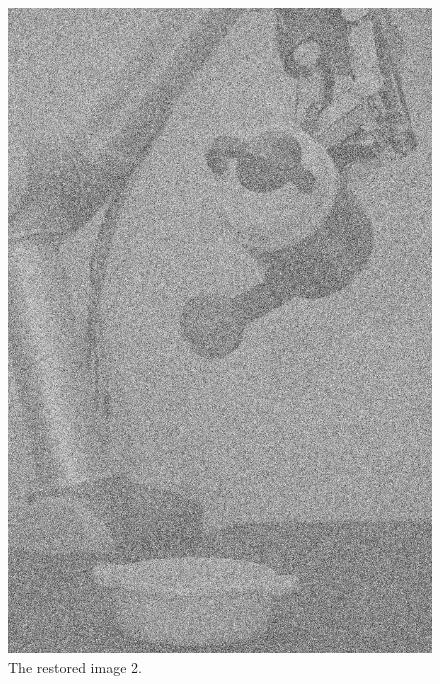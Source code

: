 \begin{figure}[H]
\centering
\includegraphics[width = 0.8 \linewidth]{../code/images/image_result_2.png}
\caption{The restored image 2.}
\label{fig:image_2_restored}
\end{figure}
